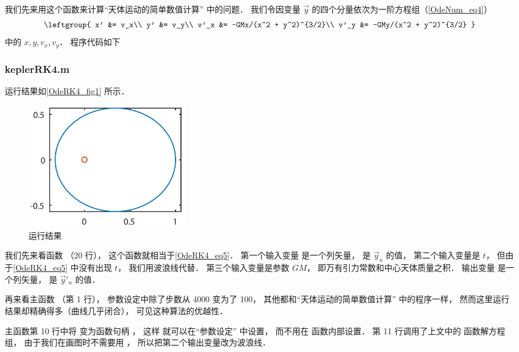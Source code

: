 我们先来用这个函数来计算“天体运动的简单数值计算” 中的问题． 我们令因变量 $\vec y$ 的四个分量依次为一阶方程组（\autoref{OdeNum_eq4}）
\begin{equation}\label{OdeRK4_eq5}
\leftgroup{
x' &= v_x\\
y' &= v_y\\
v'_x &= -GMx/(x^2 + y^2)^{3/2}\\
v'_y &= -GMy/(x^2 + y^2)^{3/2}
}\end{equation}
中的 $x, y, v_x, v_y$． 程序代码如下

\subsubsection{keplerRK4.m}


运行结果如\autoref{OdeRK4_fig1} 所示．

\begin{figure}[ht]
\centering
\includegraphics[width=7cm]{./figures/OdeRK4.pdf}
\caption{运行结果} \label{OdeRK4_fig1}
\end{figure}

我们先来看函数  （20 行）， 这个函数就相当于\autoref{OdeRK4_eq5}． 第一个输入变量  是一个列矢量， 是 $\vec y_n$ 的值， 第二个输入变量是 $t$， 但由于\autoref{OdeRK4_eq5} 中没有出现 $t$， 我们用波浪线代替． 第三个输入变量是参数 $GM$， 即万有引力常数和中心天体质量之积． 输出变量  是一个列矢量， 是 $\vec y'_n$ 的值．

再来看主函数  （第 1 行）， 参数设定中除了步数从 4000 变为了 100， 其他都和“天体运动的简单数值计算” 中的程序一样， 然而这里运行结果却精确得多（曲线几乎闭合）， 可见这种算法的优越性．

主函数第 10 行中将  变为函数句柄 ， 这样  就可以在“参数设定” 中设置， 而不用在  函数内部设置． 第 11 行调用了上文中的  函数解方程组， 由于我们在画图时不需要用 ， 所以把第二个输出变量改为波浪线．
